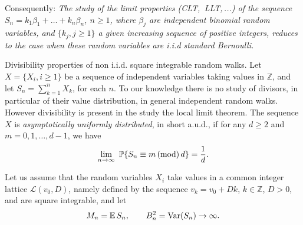\documentclass[11pt,draft,reqno]{amsart}
\makeatletter
\def\section{\@startsection{section}{1}%
     \z@{.7\linespacing\@plus\linespacing}{.5\linespacing}%
     {\bfseries%
     \centering
     }}
\theoremstyle{definition}
\theoremstyle{remarks}
\numberwithin{equation}{section}
\def \b{{\beta}}
\def \qq{{\qquad}}
\def\P{{\mathcal P}}
\def\P{{\mathbb P}}
\def\Z{{\mathbb Z}}
\makeatother
\begin{document}
   Consequently:     
    {\it      The study of the  limit properties (CLT,\, LLT,\,...) of the sequence
$S_n= k_1\b_1+
\ldots + k_n\b_n$, $n\ge 1$,  where 
$\b_j$ are independent binomial random variables, and   $\{k_j, j\ge 1\}$   a given increasing sequence of positive integers,   reduces to the case when these random variables are   i.i.d      standard Bernoulli.}
     
     
     
     
     
     
     
     
     
     
     
     
     
     
     
     
     
     
     
     
     
          
     
     \section{Divisibility properties of  non i.i.d. square integrable random walks.} \label{s5}
      Let $X=\{X_i , i\ge 1\}$ be  a sequence of  independent  variables taking values in $\Z$, 
and let $S_n=\sum_{k=1}^n X_k$, for each $n$. 
To our knowledge there is no study of divisors, in particular of their value distribution, in general independent   random walks. However divisibility is present in the study   the local limit theorem.  The sequence $X$ is  \emph{asymptotically uniformly distributed}, in short a.u.d., if   for any $d\ge 2$ and $m = 0,1,\ldots,d-1$, we
have
 \begin{equation} \label{aud1}\lim_{n\to \infty}\ \P\{S_n \equiv m \,{\rm (mod)}\,d\}=\frac1d.
  \end{equation}
 
  Let us assume   that the random variables $X_i$ take values in a common integer lattice $\mathcal L(v_{0},D )$, namely defined by the
 sequence $v_{ k}=v_{ 0}+D k$, $k\in \Z$,   $D >0$, and are  square integrable,  
and let     
\begin{equation} \label{MnBn}M_n= {\mathbb E\,} S_n , \qq B_n^2={\rm Var}(S_n)\to \infty.
\end{equation}
 
\end{document}
